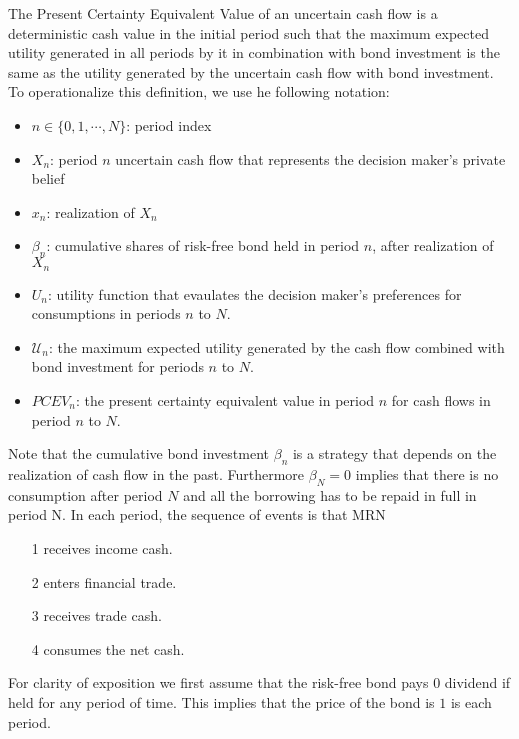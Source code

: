 \documentclass{article}[12pt letter]
\begin{document}
The Present Certainty Equivalent Value of an uncertain cash flow is a deterministic cash value in the initial period such that  the maximum expected utility generated in all periods by it in combination with bond investment is the same as the utility generated by the uncertain cash flow with bond investment. To operationalize this definition, we use he following notation:
\begin{itemize}
\item $n\in \{0,1, \cdots, N\}$: period index
\item $X_n$: period $n$ uncertain cash flow that represents the decision maker's private belief
\item $x_n$: realization of $X_n$
\item $\beta_n$:  cumulative shares of risk-free bond held in period $n$, after realization of $X_n$
\item $U_n$: utility function that evaulates the decision maker's preferences for consumptions in periods $n$ to $N$.
\item $\mathcal{U}_n$: the maximum expected utility generated by the cash flow combined with  bond investment for periods $n$ to $N$.
\item $PCEV_n$: the present certainty equivalent value in period $n$ for  cash flows in period $n$ to $N$.
\end{itemize}
Note that the cumulative bond investment $\beta_n$ is a strategy that depends on the realization of cash flow in the past. Furthermore $\beta_N=0$ implies that there is no consumption after period $N$ and all the borrowing has to be repaid in full in period N. In each period, the sequence of events is that MRN
\begin{itemize}
\item[1] receives income cash.
\item[2] enters financial trade.
\item[3] receives trade cash.
\item[4] consumes the net cash.
\end{itemize}




For clarity of exposition we first assume that the risk-free bond pays $0$ dividend if held for any period of time. This implies that the price of the bond is $1$ is each period.
\end{document}
